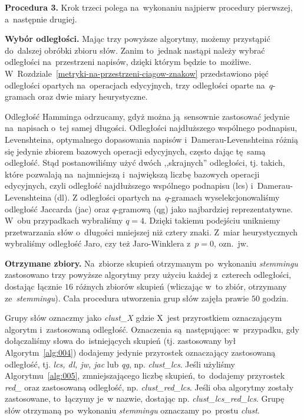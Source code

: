 \documentclass{praca1}
\begin{document}
\textbf{Procedura 3.} Krok trzeci polega na~wykonaniu najpierw procedury pierwszej, a~następnie drugiej.

\textbf{Wybór odległości.} Mając trzy powyższe algorytmy, możemy przystąpić do~dalszej obróbki zbioru słów. Zanim to~jednak nastąpi należy wybrać odległości na~przestrzeni napisów, dzięki którym będzie to~możliwe. W~Rozdziale~\ref{metryki-na-przestrzeni-ciagow-znakow} przedstawiono pięć odległości opartych na~operacjach edycyjnych, trzy odległości oparte na~$q$-gramach oraz dwie miary heurystyczne. 

Odległość Hamminga odrzucamy, gdyż można ją~sensownie zastosować jedynie na~napisach o~tej samej długości. Odległości najdłuższego wspólnego podnapisu, Levenshteina, optymalnego dopasowania napisów i~Damerau-Levenshteina różnią się jedynie zbiorem bazowych operacji edycyjnych, często dając tę~samą odległość. Stąd postanowiliśmy użyć dwóch ,,skrajnych'' odległości, tj. takich, które pozwalają na~najmniejszą i~największą liczbę bazowych operacji edycyjnych, czyli odległość najdłuższego wspólnego podnapisu (lcs) i~Damerau-Levenshteina (dl). Z odległości opartych na~$q$-gramach wyselekcjonowaliśmy odległość Jaccarda (jac) oraz $q$-gramową (qg) jako najbardziej reprezentatywne. W~obu przypadkach wybraliśmy $q=4$. Dzięki takiemu podejściu unikniemy przetwarzania słów o~długości mniejszej niż cztery znaki. Z~miar heurystycznych wybraliśmy odległość Jaro, czy też Jaro-Winklera z~$p=0$, ozn.~jw.

\textbf{Otrzymane zbiory.} Na~zbiorze skupień otrzymanym po~wykonaniu \emph{stemmingu} zastosowano trzy powyższe algorytmy przy użyciu każdej z~czterech odległości, dostając łącznie $16$ różnych zbiorów skupień (wliczając w~to zbiór, otrzymany ze~\emph{stemmingu}). Cała procedura utworzenia grup słów zajęła prawie $50$ godzin. 

Grupy słów oznaczmy jako \emph{clust\_X} gdzie X~jest przyrostkiem oznaczającym algorytm i~zastosowaną odległość. Oznaczenia są~następujące: w~przypadku, gdy dołączaliśmy słowa do~istniejących skupień (tj. zastosowany był Algorytm~\ref{alg:004}) dodajemy jedynie przyrostek oznaczający zastosowaną odległość, tj. \emph{lcs, dl, jw, jac} lub \emph{qg}, np. \emph{clust\_lcs}. Jeśli użyliśmy Algorytmu~\ref{alg:005}, zmniejszającego liczbę skupień, to~dodajemy przyrostek \emph{red\_} oraz zastosowaną odległość, np. \emph{clust\_red\_lcs}. Jeśli oba algorytmy zostały zastosowane, to~łączymy je~w nazwie, dostając np. \emph{clust\_lcs\_red\_lcs}. Grupę słów otrzymaną po~wykonaniu \emph{stemmingu} oznaczamy po~prostu \emph{clust}. 
\end{document}

